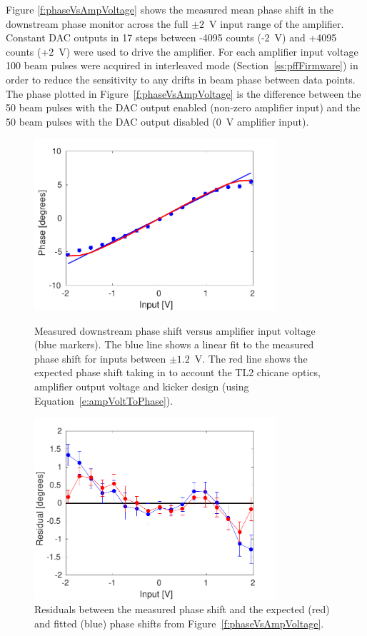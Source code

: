 Figure \ref{f:phaseVsAmpVoltage} shows the measured mean phase shift in the downstream phase monitor across the full \(\pm2\)~V input range of the amplifier. Constant DAC outputs in 17 steps between -4095 counts (-2~V) and +4095 counts (+2~V) were used to drive the amplifier. For each amplifier input voltage 100 beam pulses were acquired in interleaved mode (Section~\ref{ss:pffFirmware}) in order to reduce the sensitivity to any drifts in beam phase between data points. The phase plotted in Figure~\ref{f:phaseVsAmpVoltage} is the difference between the 50 beam pulses with the DAC output enabled (non-zero amplifier input) and the 50 beam pulses with the DAC output disabled (0~V amplifier input).

\begin{figure}
  \centering
  \includegraphics[width=0.8\textwidth]{Figures/commissioning/phaseVsAmpVoltage}
  \caption{Measured downstream phase shift versus amplifier input voltage (blue markers). The blue line shows a linear fit to the measured phase shift for inputs between \(\pm1.2\)~V. The red line shows the expected phase shift taking in to account the TL2 chicane optics, amplifier output voltage and kicker design (using Equation~\ref{e:ampVoltToPhase}).}
  \label{f:phaseVsAmpVoltage}
  \includegraphics[width=0.8\textwidth]{Figures/commissioning/phaseVsAmpVoltage_residuals}
  \caption{Residuals between the measured phase shift and the expected (red) and fitted (blue) phase shifts from Figure~\ref{f:phaseVsAmpVoltage}.}
  \label{f:phaseVsAmp_resid}
\end{figure}


